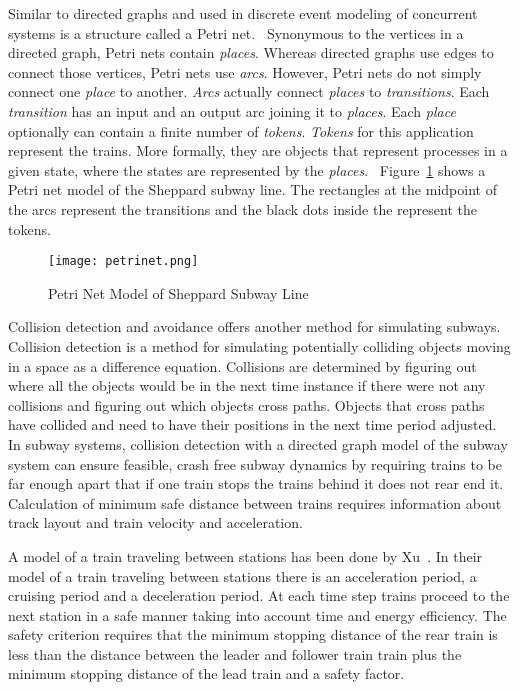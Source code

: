 Similar to directed graphs and used in discrete event modeling of concurrent
systems is a structure called a Petri net.~\cite{Petri62}  Synonymous to the
vertices in a directed graph, Petri nets contain \textit{places}.  Whereas
directed graphs use edges to connect those vertices, Petri nets use
\textit{arcs}. However, Petri nets do not simply connect one \textit{place} to
another.  \textit{Arcs} actually connect \textit{places} to
\textit{transitions}. Each \textit{transition} has an input and an output arc
joining it to \textit{places}.  Each \textit{place} optionally can contain a
finite number of \textit{tokens}.  \textit{Tokens} for this application
represent the trains.  More formally, they are objects that represent processes
in a given state, where the states are represented by the
\textit{places}.~\cite{Kristoffersen2003}  Figure~\ref{fig:petrinet} shows a
Petri net model of the Sheppard subway line. The rectangles at the midpoint of
the arcs represent the transitions and the black dots inside the represent the
tokens.
%
\begin{figure}[htb]
	\centering
	\texttt{[image: petrinet.png]}
	\caption{Petri Net Model of Sheppard Subway Line}
	\label{fig:petrinet}
\end{figure}
%

Collision detection and avoidance offers another method for simulating subways.
Collision detection is a method for simulating potentially colliding objects
moving in a space as a difference equation. Collisions are determined by
figuring out where all the objects would be in the next time instance if there
were not any collisions and figuring out which objects cross paths. Objects that
cross paths have collided and need to have their positions in the next time
period adjusted. In subway systems, collision detection with a directed graph model of the subway system can ensure feasible, crash free subway dynamics by requiring trains to be far enough apart that if one train stops the trains behind it does not rear end it. Calculation of minimum safe distance between trains requires information
about track layout and train velocity and acceleration. 

A model of a train traveling between stations has been done by Xu~\cite{Xu2014}. In their model of a train traveling between stations there is an acceleration period, a cruising period and a deceleration period. At each time step trains proceed to the next station in a safe manner taking into account time and energy efficiency. The safety criterion requires that the minimum stopping distance of the rear train is less than the distance between the leader and follower train train plus the minimum stopping distance of the lead train and a safety factor. 

